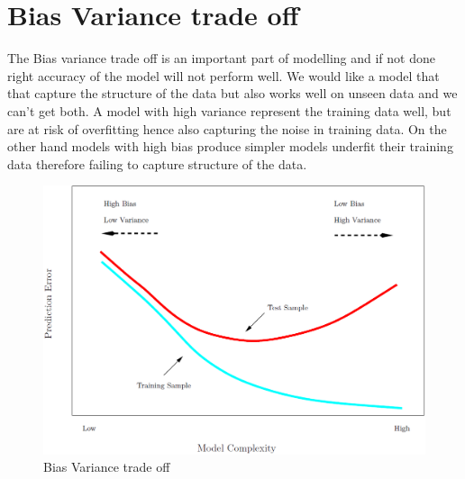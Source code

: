 \section {Bias Variance trade off}
The Bias variance trade off is an important part of modelling and if not done right accuracy of the model will not perform well. We would like a model that that capture the structure of the data but also works well on unseen data and we can't get both. A model with high variance represent the training data well, but are at risk of overfitting hence also capturing the noise in training data. On the other hand models with high bias produce simpler models underfit their training data therefore failing to capture structure of the data.

\begin{figure}[h]
	\centering
	\includegraphics[width=0.5\linewidth]{crossValidation/biasVariance}
	\caption{Bias Variance trade off}
	\label{fig:biasvariance}
\end{figure}
